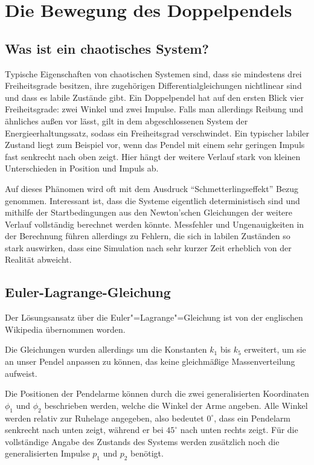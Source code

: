 
\section{Die Bewegung des Doppelpendels}
\subsection{Was ist ein chaotisches System?}
Typische Eigenschaften von chaotischen Systemen sind, dass sie mindestens drei Freiheitsgrade besitzen, ihre zugehörigen Differentialgleichungen nichtlinear sind und dass es labile Zustände gibt. \citep{wikichaos}
Ein Doppelpendel hat auf den ersten Blick vier Freiheitsgrade: zwei Winkel und zwei Impulse.
Falls man allerdings Reibung und ähnliches außen vor lässt, gilt in dem abgeschlossenen System der Energieerhaltungssatz, sodass ein Freiheitsgrad verschwindet.
Ein typischer labiler Zustand liegt zum Beispiel vor, wenn das Pendel mit einem sehr geringen Impuls fast senkrecht nach oben zeigt.
Hier hängt der weitere Verlauf stark von kleinen Unterschieden in Position und Impuls ab.

Auf dieses Phänomen wird oft mit dem Ausdruck "`Schmetterlingseffekt"' Bezug genommen.
Interessant ist, dass die Systeme eigentlich deterministisch sind und mithilfe der Startbedingungen aus den Newton'schen Gleichungen der weitere Verlauf vollständig berechnet werden könnte.
Messfehler und Ungenauigkeiten in der Berechnung führen allerdings zu Fehlern, die sich in labilen Zuständen so stark auswirken, dass eine Simulation nach sehr kurzer Zeit erheblich von der Realität abweicht.

\subsection{Euler-Lagrange-Gleichung}
Der Lösungsansatz über die Euler"=Lagrange"=Gleichung ist von der englischen Wikipedia übernommen worden.
\citep{wikidoublependulum}

Die Gleichungen wurden allerdings um die Konstanten $k_1$ bis $k_5$ erweitert, um sie an unser Pendel anpassen zu können, das keine gleichmäßige Massenverteilung aufweist.

Die Positionen der Pendelarme können durch die zwei generalisierten Koordinaten $\phi_1$ und $\phi_2$ beschrieben werden, welche die Winkel der Arme angeben.
Alle Winkel werden relativ zur Ruhelage angegeben, also bedeutet $0^\circ$, dass ein Pendelarm senkrecht nach unten zeigt, während er bei $45^\circ$ nach unten rechts zeigt.
Für die vollständige Angabe des Zustands des Systems werden zusätzlich noch die generalisierten Impulse $p_1$ und $p_2$ benötigt.

